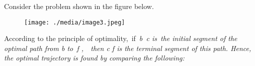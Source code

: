 \documentclass[12pt,twoside]{article}
\begin{document}
\begin{itemize}
\vspace{\baselineskip}
{\fontsize{10pt}{12.0pt}\selectfont Consider the problem shown in the figure below.\par}\par


\vspace{\baselineskip}



\begin{figure}[H]
\advance\leftskip 3.18in		\texttt{[image: ./media/image3.jpeg]}
\end{figure}



{\fontsize{10pt}{12.0pt}\selectfont \par}\par


\vspace{\baselineskip}
{\fontsize{10pt}{12.0pt}\selectfont According to the principle of optimality,\  if\  \textit{b\  c is\ the initial segment of the optimal path from  b to\  f ,\ \  then c f is the terminal segment of this path. Hence, the optimal trajectory is found by comparing the following:}\par}\par


\end{itemize}
\end{document}

